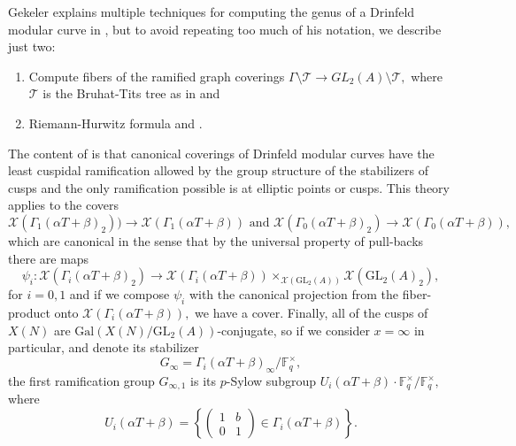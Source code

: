 \documentclass[11pt]{amsart}
\theoremstyle{definition}
\numberwithin{equation}{section}
\newcommand{\GL}{\mathrm{GL}} 	%
\newcommand{\Gal}{\mathrm{Gal}} 	%
\newcommand{\sT}{\mathscr{T}}		%
\newcommand{\sX}{\mathscr{X}}		%
\newcommand{\bbF}{\mathbb{F}}		%
\begin{document}
Gekeler explains multiple techniques for computing the genus of a Drinfeld modular curve in \cite[Section $8$]{Gekeler-Invariants}, but to avoid repeating too much of his notation, we describe just two:
\begin{enumerate}
	\item Compute fibers of the ramified graph coverings $\Gamma\setminus \sT\to GL_2(A)\setminus \sT,$ where $\sT$ is the Bruhat-Tits tree as in \cite{Gekeler-Nonnengardt-BruhatTitsTrees} and \cite{Franklin-Ho-Papikian-DrinfeldCurves-SL}
	
	\item Riemann-Hurwitz formula and \cite[Proposition $8.3$]{Gekeler-Invariants}.
\end{enumerate}
The content of \cite[Proposition $8.3$]{Gekeler-Invariants} is that canonical coverings of Drinfeld modular curves have the least cuspidal ramification allowed by the group structure of the stabilizers of cusps and the only ramification possible is at elliptic points or cusps. 
This theory applies to the covers \[\sX(\Gamma_1(\alpha T+\beta)_2))\to \sX(\Gamma_1(\alpha T+\beta))\text{ and }\sX(\Gamma_0(\alpha T+\beta)_2)\to \sX(\Gamma_0(\alpha T+\beta)),\] which are canonical in the sense that by the universal property of pull-backs there are maps 
\[\psi_i:\sX(\Gamma_i(\alpha T+\beta)_2)\to 
\sX(\Gamma_i(\alpha T+\beta))\times_{\sX(\GL_2(A))}\sX(\GL_2(A)_2),\]
for $i=0, 1$ and if we compose $\psi_i$ with the canonical projection from the fiber-product onto $\sX(\Gamma_i(\alpha T+\beta)),$ we have a cover. Finally, all of the cusps of $X(N)$ are $\Gal(X(N)/\GL_2(A))$-conjugate, so if we consider $x=\infty$ in particular, and denote its stabilizer \[G_{\infty}=\Gamma_i(\alpha T+\beta)_{\infty}/\bbF_q^{\times},\] the first ramification group $G_{\infty, 1}$ is its $p$-Sylow subgroup $U_i(\alpha T+\beta)\cdot \bbF_q^{\times}/\bbF_q^{\times},$ where \[U_i(\alpha T+\beta)=\left\{\left(\begin{array}{cc}1&b\\0&1\end{array}\right)\in \Gamma_i(\alpha T+\beta)\right\}.\]
\end{document}
